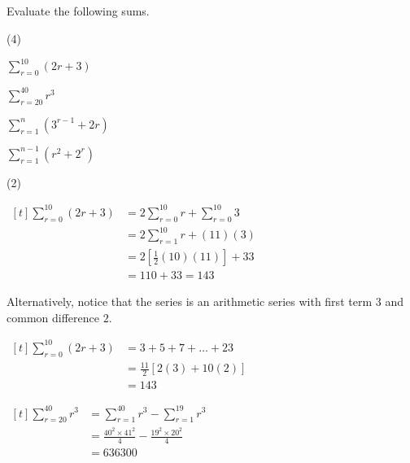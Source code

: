 \documentclass[11pt,a4paper]{book}
\begin{document}
\begin{example}

Evaluate the following sums.

\begin{tasks}[label=(\alph*),label-width=3.5ex](4)  

\task ${\displaystyle \sum_{r=0}^{10}\left(2r+3\right)}$

\task ${\displaystyle \sum_{r=20}^{40}r^{3}}$

\task  ${\displaystyle \sum_{r=1}^{n}\left(3^{r-1}+2r\right)}$

\task  ${\displaystyle \sum_{r=1}^{n-1}\left(r^{2}+2^{r}\right)}$

\end{tasks}

\Solution

\begin{tasks}[label=(\alph*),label-width=3.5ex](2)  

\task*  \begin{minipage}[t]{0.45\textwidth} 

$
\begin{aligned}[t]
\sum_{r=0}^{10}\left(2r+3\right) & =2\sum_{r=0}^{10}r+\sum_{r=0}^{10}3\\
 & =2\sum_{r=1}^{10}r+\left(11\right)\left(3\right)\\
 & =2\left[\frac{1}{2}\left(10\right)\left(11\right)\right]+33\\
 & =110+33=143
\end{aligned}
$

\end{minipage}
\begin{minipage}[t]{0.45\textwidth} 

Alternatively, notice that the series is an arithmetic series with
first term $3$ and common difference $2$.

$
\begin{aligned}[t]
\sum_{r=0}^{10}\left(2r+3\right) & =3+5+7+\ldots+23\\
 & =\frac{11}{2}\left[2\left(3\right)+10\left(2\right)\right]\\
 & =143
\end{aligned}
$

\end{minipage}

\task  
$
\begin{aligned}[t]
\sum_{r=20}^{40}r^{3} & =\sum_{r=1}^{40}r^{3}-\sum_{r=1}^{19}r^{3}\\
 & =\frac{40^{2}\times41^{2}}{4}-\frac{19^{2}\times20^{2}}{4}\\
 & =636300
\end{aligned}
$


\end{tasks}
\end{example}
\end{document}
